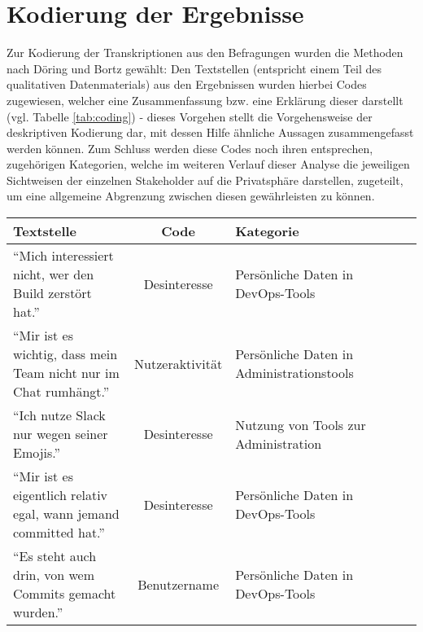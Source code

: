 \section{Kodierung der Ergebnisse}
Zur Kodierung der Transkriptionen aus den Befragungen wurden die Methoden nach Döring und Bortz gewählt: Den Textstellen (entspricht einem Teil des qualitativen Datenmaterials) aus den Ergebnissen wurden hierbei 
Codes zugewiesen, welcher eine Zusammenfassung bzw. eine Erklärung dieser darstellt \cite{Doring:2014aa} (vgl. Tabelle \ref{tab:coding}) - dieses Vorgehen stellt die Vorgehensweise der deskriptiven Kodierung dar, mit
dessen Hilfe ähnliche Aussagen zusammengefasst werden können. \newline Zum Schluss werden diese Codes noch ihren entsprechen, zugehörigen Kategorien, welche im weiteren Verlauf dieser Analyse die jeweiligen Sichtweisen der einzelnen
Stakeholder auf die Privatsphäre darstellen, zugeteilt, um eine allgemeine Abgrenzung zwischen diesen gewährleisten zu können.
\begin{table*}[t]
    \caption{Repräsentatives Codierungs- und Kategorisierungsbeispiel der erhobenen Daten (in Anlehnung an Döring und Bortz \cite{Doring:2014aa})}
    \label{tab:coding}
    \centering
    \small %
    {\renewcommand{\arraystretch}{1.3} %
    \begin{tabularx}{\linewidth}{@{}lcXlcc@{}} %
      \toprule
      Textstelle & Code & Kategorie \\
      \midrule
        \enquote{Mich interessiert nicht, wer den Build zerstört hat.}                  & Desinteresse                  & Persönliche Daten in DevOps-Tools             \\
        \enquote{Mir ist es wichtig, dass mein Team nicht nur im Chat rumhängt.}        & Nutzeraktivität               & Persönliche Daten in Administrationstools     \\
        \enquote{Ich nutze Slack nur wegen seiner Emojis.}                              & Desinteresse                  & Nutzung von Tools zur Administration          \\
        \enquote{Mir ist es eigentlich relativ egal, wann jemand committed hat.}        & Desinteresse                  & Persönliche Daten in DevOps-Tools             \\
        \enquote{Es steht auch drin, von wem Commits gemacht wurden.}                   & Benutzername                  & Persönliche Daten in DevOps-Tools             \\
      \bottomrule
    \end{tabularx}
    }
  \end{table*}